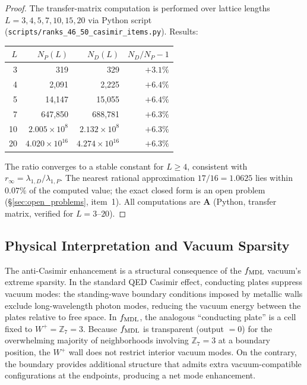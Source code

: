 \documentclass[11pt]{article}
\theoremstyle{remark}
\newcommand{\CatA}{\textbf{A}}
\begin{document}
\begin{proof}
The transfer-matrix computation is performed over lattice lengths
$L = 3, 4, 5, 7, 10, 15, 20$ via Python script
(\texttt{scripts/ranks\_46\_50\_casimir\_items.py}).
Results:
\begin{center}
\small
\begin{tabular}{rrrr}
\toprule
$L$ & $N_P(L)$ & $N_D(L)$ & $N_D/N_P - 1$ \\
\midrule
3  & 319            & 329            & $+3.1\%$ \\
4  & 2,091          & 2,225          & $+6.4\%$ \\
5  & 14,147         & 15,055         & $+6.4\%$ \\
7  & 647,850        & 688,781        & $+6.3\%$ \\
10 & $2.005 \times 10^{8}$ & $2.132 \times 10^{8}$ & $+6.3\%$ \\
20 & $4.020 \times 10^{16}$ & $4.274 \times 10^{16}$ & $+6.3\%$ \\
\bottomrule
\end{tabular}
\end{center}
The ratio converges to a stable constant for $L \geq 4$, consistent with
$r_\infty = \lambda_{1,D}/\lambda_{1,P}$.
The nearest rational approximation $17/16 = 1.0625$ lies within $0.07\%$
of the computed value; the exact closed form is an open problem
(\S\ref{sec:open_problems}, item~1).
All computations are $\CatA$ (Python, transfer matrix, verified for $L = 3$--$20$).
\end{proof}

\subsection{Physical Interpretation and Vacuum Sparsity}
\label{sec:casimir_interp}

The anti-Casimir enhancement is a structural consequence of the $f_{\rm MDL}$
vacuum's extreme sparsity.
In the standard QED Casimir effect, conducting plates suppress vacuum modes:
the standing-wave boundary conditions imposed by metallic walls exclude
long-wavelength photon modes, reducing the vacuum energy between the plates
relative to free space.
In $f_{\rm MDL}$, the analogous ``conducting plate'' is a cell fixed to
$W^+ = \mathbb{Z}_7 = 3$.
Because $f_{\rm MDL}$ is transparent (output $= 0$) for the overwhelming
majority of neighborhoods involving $\mathbb{Z}_7 = 3$ at a boundary position,
the $W^+$ wall does not restrict interior vacuum modes.
On the contrary, the boundary provides additional structure that admits
extra vacuum-compatible configurations at the endpoints, producing a net
mode enhancement.
\end{document}
